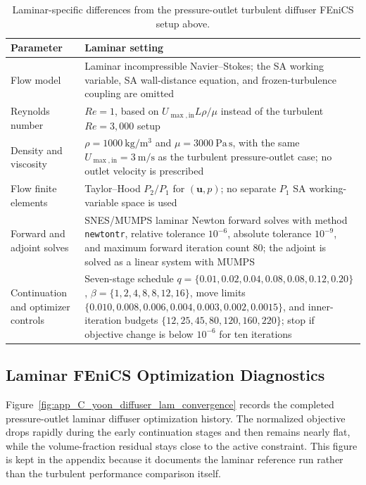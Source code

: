 \begin{table}[htbp]
	\centering
	\footnotesize
	\caption{Laminar-specific differences from the pressure-outlet turbulent diffuser FEniCS setup above.}
	\label{tab:app_C_yoon_diffuser_lam_differences}
	\renewcommand{\arraystretch}{1.2}
	\begin{tabularx}{\textwidth}{l X}
		\hline
		\textbf{Parameter} & \textbf{Laminar setting} \\
		\hline
			Flow model & Laminar incompressible Navier--Stokes; the SA working variable, SA wall-distance equation, and frozen-turbulence coupling are omitted \\
			Reynolds number & $Re=1$, based on $U_{\max,\mathrm{in}}L\rho/\mu$ instead of the turbulent $Re=3{,}000$ setup \\
			Density and viscosity & $\rho=1000~\mathrm{kg/m^3}$ and $\mu=3000~\mathrm{Pa\,s}$, with the same $U_{\max,\mathrm{in}}=3~\mathrm{m/s}$ as the turbulent pressure-outlet case; no outlet velocity is prescribed \\
			Flow finite elements & Taylor--Hood $P_2/P_1$ for $(\mathbf{u},p)$; no separate $P_1$ SA working-variable space is used \\
			Forward and adjoint solves & SNES/MUMPS laminar Newton forward solves with method \texttt{newtontr}, relative tolerance $10^{-6}$, absolute tolerance $10^{-9}$, and maximum forward iteration count $80$; the adjoint is solved as a linear system with MUMPS \\
			Continuation and optimizer controls & Seven-stage schedule $q=\{0.01,0.02,0.04,0.08,0.08,0.12,0.20\}$, $\beta=\{1,2,4,8,8,12,16\}$, move limits $\{0.010,0.008,0.006,0.004,0.003,0.002,0.0015\}$, and inner-iteration budgets $\{12,25,45,80,120,160,220\}$; stop if objective change is below $10^{-6}$ for ten iterations \\
		\hline
	\end{tabularx}
\end{table}

\subsection{Laminar FEniCS Optimization Diagnostics}
\label{subsec:app_C_yoon_diffuser_lam_diagnostics}
Figure~\ref{fig:app_C_yoon_diffuser_lam_convergence} records the completed pressure-outlet laminar diffuser optimization history. The normalized objective drops rapidly during the early continuation stages and then remains nearly flat, while the volume-fraction residual stays close to the active constraint. This figure is kept in the appendix because it documents the laminar reference run rather than the turbulent performance comparison itself.

